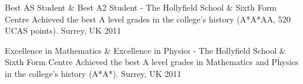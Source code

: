 \begin{cvhonors}
  \cvhonor
  	{}
    {Best AS Student \& Best A2 Student - The Hollyfield School \& Sixth Form Centre} %
    {Achieved the best A level grades in the college's history (A*A*AA, 520 UCAS points).} %
    {Surrey, UK} %
    {2011} %

  \cvhonor
  	{}
    {Excellence in Mathematics \& Excellence in Physics - The Hollyfield School \& Sixth Form Centre} %
    {Achieved the best A level grades in Mathematics and Physics in the college's history (A*A*).} %
    {Surrey, UK} %
    {2011} %

\end{cvhonors}
